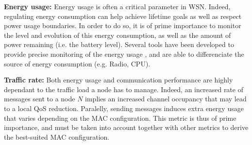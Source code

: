 \documentclass[12pt,journal,compsoc]{IEEEtran}
\begin{document}




\textbf{Energy usage:} Energy usage is often a critical parameter in WSN. Indeed, regulating energy consumption can help achieve lifetime goals as well as respect power usage boundaries. In order to do so, it is of prime importance to monitor the level and evolution of this energy consumption, as well as the amount of power remaining (i.e. the battery level). Several tools have been developed to provide precise monitoring of the energy usage \cite{dot07energest}, and are able to differenciate the source of energy consumption (e.g. Radio, CPU). %

\textbf{Traffic rate:} Both energy usage and communication performance are highly dependant to the traffic load a node has to manage. Indeed, an increased rate of messages sent to a node $N$ implies an increased channel occupancy that may lead to a local QoS reduction. Paralelly, sending messages induces extra energy usage that varies depending on the MAC configuration. This metric is thus of prime importance, and must be taken into account together with other metrics to derive the best-suited MAC configuration.
\end{document}
